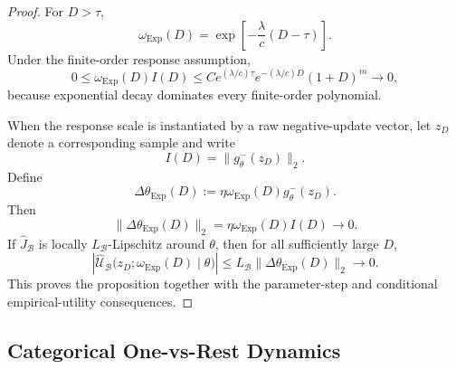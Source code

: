 \documentclass{article}
\theoremstyle{plain}
\theoremstyle{definition}
\theoremstyle{remark}
\begin{document}
\begin{proof}
For \(D>\tau\),
\[
\omega_{\mathrm{Exp}}(D)
=
\exp\left[-\frac{\lambda}{c}(D-\tau)\right].
\]
Under the finite-order response assumption,
\[
0
\le
\omega_{\mathrm{Exp}}(D)I(D)
\le
C e^{(\lambda/c)\tau}
e^{-(\lambda/c)D}(1+D)^m
\longrightarrow0,
\]
because exponential decay dominates every finite-order polynomial.

When the response scale is instantiated by a raw negative-update
vector, let \(z_D\) denote a corresponding sample and write
\[
I(D)=\|g_\theta^-(z_D)\|_2.
\]
Define
\[
\Delta\theta_{\mathrm{Exp}}(D)
:=
\eta\omega_{\mathrm{Exp}}(D)g_\theta^-(z_D).
\]
Then
\[
\|\Delta\theta_{\mathrm{Exp}}(D)\|_2
=
\eta\omega_{\mathrm{Exp}}(D)I(D)
\longrightarrow0.
\]
If \(\widehat J_{\mathcal B}\) is locally
\(L_{\mathcal B}\)-Lipschitz around \(\theta\), then for all sufficiently
large \(D\),
\[
\left|
\widehat{\mathcal U}_{\mathcal B}
\bigl(z_D;\omega_{\mathrm{Exp}}(D)\mid\theta\bigr)
\right|
\le
L_{\mathcal B}
\|\Delta\theta_{\mathrm{Exp}}(D)\|_2
\longrightarrow0.
\]
This proves the proposition together with the parameter-step and
conditional empirical-utility consequences.
\end{proof}

\subsection{Categorical One-vs-Rest Dynamics}
\label{app:categorical_self_limiting}
\end{document}
